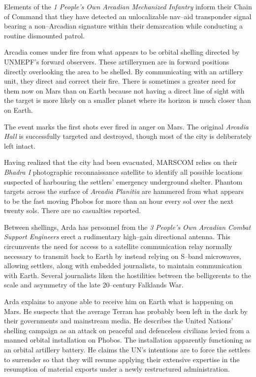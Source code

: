 

Elements of the {\it 1 People's Own Arcadian Mechanized Infantry} inform their Chain of Command that they have detected an unlocalizable nav--aid transponder signal bearing a non--Arcadian signature within their demarcation while conducting a routine dismounted patrol.
\StopTimelineDate

Arcadia comes under fire from what appears to be orbital shelling directed by UNMEPF's forward observers. These artillerymen are in forward positions directly overlooking the area to be shelled. By communicating with an artillery unit, they direct and correct their fire. There is sometimes a greater need for them now on Mars than on Earth because not having a direct line of sight with the target is more likely on a smaller planet where its horizon is much closer than on Earth. 

The event marks the first shots ever fired in anger on Mars. The original {\it Arcadia Hall} is successfully targeted and destroyed, though most of the city is deliberately left intact. 

Having realized that the city had been evacuated, MARSCOM relies on their {\it Bhadra I} photographic reconnaissance satellite to identify all possible locations suspected of harbouring the settlers' emergency underground shelter. Phantom targets across the surface of {\it Arcadia Planitia} are hammered from what appears to be the fast moving Phobos for more than an hour every sol over the next twenty sols. There are no casualties reported.

Between shellings, Arda has personnel from the {\it 3 People's Own Arcadian Combat Support Engineers} erect a rudimentary high--gain directional antenna. This circumvents the need for access to a satellite communication relay normally necessary to transmit back to Earth by instead relying on S--band microwaves, allowing settlers, along with embedded journalists, to maintain communication with Earth. Several journalists liken the hostilities between the belligerents to the scale and asymmetry of the late 20--century Falklands War.

Arda explains to anyone able to receive him on Earth what is happening on Mars. He suspects that the average Terran has probably been left in the dark by their governments and mainstream media. He describes the United Nations' shelling campaign as an attack on peaceful and defenceless civilians levied from a manned orbital installation on Phobos. The installation apparently functioning as an orbital artillery battery. He claims the UN's intentions are to force the settlers to surrender so that they will resume applying their extensive expertise in the resumption of material exports under a newly restructured administration.

